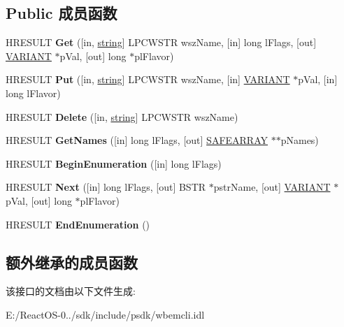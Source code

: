 \subsection*{Public 成员函数}
\begin{DoxyCompactItemize}
\item 
\mbox{\label{interface_i_wbem_qualifier_set_a13a2de896fc4aea7d5cbdd3475332194}} 
H\+R\+E\+S\+U\+LT {\bfseries Get} (\mbox{[}in, \hyperlink{structstring}{string}\mbox{]} L\+P\+C\+W\+S\+TR wsz\+Name, \mbox{[}in\mbox{]} long l\+Flags, \mbox{[}out\mbox{]} \hyperlink{structtag_v_a_r_i_a_n_t}{V\+A\+R\+I\+A\+NT} $\ast$p\+Val, \mbox{[}out\mbox{]} long $\ast$pl\+Flavor)
\item 
\mbox{\label{interface_i_wbem_qualifier_set_a4acbebac0330beecde7fbdc74e1553f3}} 
H\+R\+E\+S\+U\+LT {\bfseries Put} (\mbox{[}in, \hyperlink{structstring}{string}\mbox{]} L\+P\+C\+W\+S\+TR wsz\+Name, \mbox{[}in\mbox{]} \hyperlink{structtag_v_a_r_i_a_n_t}{V\+A\+R\+I\+A\+NT} $\ast$p\+Val, \mbox{[}in\mbox{]} long l\+Flavor)
\item 
\mbox{\label{interface_i_wbem_qualifier_set_a211dc5c7d818819b5a846964b7aa13e8}} 
H\+R\+E\+S\+U\+LT {\bfseries Delete} (\mbox{[}in, \hyperlink{structstring}{string}\mbox{]} L\+P\+C\+W\+S\+TR wsz\+Name)
\item 
\mbox{\label{interface_i_wbem_qualifier_set_a8d629124968763f8d5e538a609e3397a}} 
H\+R\+E\+S\+U\+LT {\bfseries Get\+Names} (\mbox{[}in\mbox{]} long l\+Flags, \mbox{[}out\mbox{]} \hyperlink{structtag_s_a_f_e_a_r_r_a_y}{S\+A\+F\+E\+A\+R\+R\+AY} $\ast$$\ast$p\+Names)
\item 
\mbox{\label{interface_i_wbem_qualifier_set_a0220ce01626319ceba237aebb312946e}} 
H\+R\+E\+S\+U\+LT {\bfseries Begin\+Enumeration} (\mbox{[}in\mbox{]} long l\+Flags)
\item 
\mbox{\label{interface_i_wbem_qualifier_set_a30ce2f0211190e1714acbd83a27ba9ff}} 
H\+R\+E\+S\+U\+LT {\bfseries Next} (\mbox{[}in\mbox{]} long l\+Flags, \mbox{[}out\mbox{]} B\+S\+TR $\ast$pstr\+Name, \mbox{[}out\mbox{]} \hyperlink{structtag_v_a_r_i_a_n_t}{V\+A\+R\+I\+A\+NT} $\ast$p\+Val, \mbox{[}out\mbox{]} long $\ast$pl\+Flavor)
\item 
\mbox{\label{interface_i_wbem_qualifier_set_adc4698dcda554aa0afe79991598b4f43}} 
H\+R\+E\+S\+U\+LT {\bfseries End\+Enumeration} ()
\end{DoxyCompactItemize}
\subsection*{额外继承的成员函数}


该接口的文档由以下文件生成\+:\begin{DoxyCompactItemize}
\item 
E\+:/\+React\+O\+S-\/0../sdk/include/psdk/wbemcli.\+idl\end{DoxyCompactItemize}
